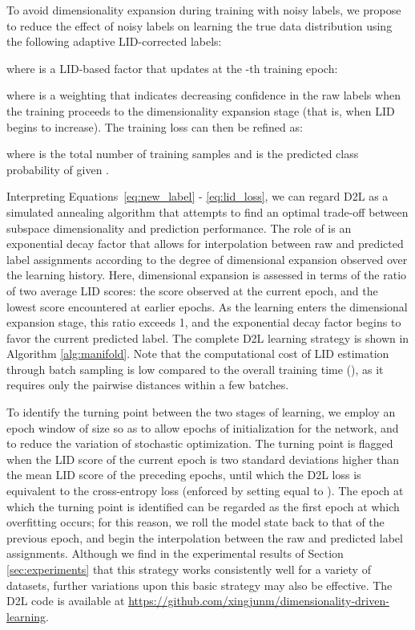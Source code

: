 \documentclass{article}
\begin{document}
To avoid dimensionality expansion during training with noisy labels, we propose to reduce the effect of noisy labels on learning the true data distribution using the following adaptive LID-corrected labels:

where  is a LID-based factor that updates at the -th training epoch:

where  is a weighting that indicates decreasing confidence in the raw labels when the training proceeds to the dimensionality expansion stage (that is, when LID begins to increase). The training loss can then be refined as:

where  is the total number of training samples and  is the predicted class probability of  given . 

Interpreting Equations~\eqref{eq:new_label} - \eqref{eq:lid_loss}, we can regard D2L as a simulated annealing algorithm that attempts to find an optimal trade-off between subspace dimensionality and prediction performance. The role of  is an exponential decay factor that allows for interpolation between raw and predicted label assignments according to the degree of dimensional expansion observed over the learning history. Here, dimensional expansion is assessed in terms of the ratio of two average LID scores: the score observed at the current epoch, and the lowest score encountered at earlier epochs. As the learning enters the dimensional expansion stage, this ratio exceeds 1, and the exponential decay factor begins to favor the current predicted label. The complete D2L learning strategy is shown in Algorithm \ref{alg:manifold}. 
Note that the computational cost of LID estimation through batch sampling is low compared to the overall training time (), as it requires only the pairwise distances within a few batches.



To identify the turning point between the two stages of learning, we employ an epoch window of size  so as to allow  epochs of initialization for the network, and to reduce the variation of stochastic optimization. The turning point is flagged when the LID score of the current epoch is two standard deviations higher than the mean LID score of the  preceding epochs, until which the D2L loss is equivalent to the cross-entropy loss (enforced by setting  equal to ). The epoch at which the turning point is identified can be regarded as the first epoch at which overfitting occurs; for this reason, we roll the model state back to that of the previous epoch, and begin the interpolation between the raw and predicted label assignments. 
Although we find in the experimental results of Section \ref{sec:experiments} that this strategy works consistently well for a variety of datasets, further variations upon this basic strategy may also be effective. The D2L code is available at \url{https://github.com/xingjunm/dimensionality-driven-learning}.
\end{document}
